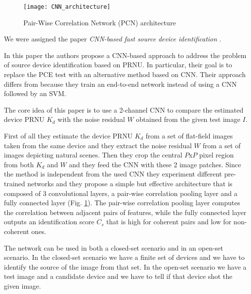 \begin{figure}[t!]
    \centering
    \texttt{[image: CNN\_architecture]}
    \caption{Pair-Wise Correlation Network (PCN) architecture}
    \label{fig:CNN_architecture}
\end{figure}

We were assigned the paper \textit{CNN-based fast source device identification} \cite{Mandelli}.

In this paper the authors propose a CNN-based approach to address the problem of source device identification based on PRNU. 
In particular, their goal is to replace the PCE test with an alternative method based on CNN. Their approach differs from \cite{Bondi}
because they train an end-to-end network instead of using a CNN followed by an SVM.

The core idea of this paper is to use a 2-channel CNN to compare the estimated device PRNU $K_d$ with the noise residual $W$ 
obtained from the given test image $I$.

First of all they estimate the device PRNU\cite{Lukas} $K_d$ from a set of flat-field images taken from the same device and they extract the
noise residual $W$ from a set of images depicting natural scenes.
Then they crop the central $P$x$P$ pixel region from both $K_d$ and $W$ and they feed the CNN with these 2 image patches.
Since the method is independent from the used CNN they experiment different pre-trained networks and they propose a simple but 
effective architecture that is composed of 3 convolutional layers, a pair-wise correlation pooling layer and a fully connected 
layer (Fig. \ref{fig:CNN_architecture}). The pair-wise correlation pooling layer computes the correlation between adjacent pairs of features, while the
fully connected layer outputs an identification score $C_s$ that is high for coherent pairs and low for non-coherent ones. 

The network can be used in both a closed-set scenario and in an open-set scenario. In the closed-set scenario we have a finite set 
of devices and we have to identify the source of the image from that set. In the open-set scenario we have a test image and a candidate
device and we have to tell if that device shot the given image.

